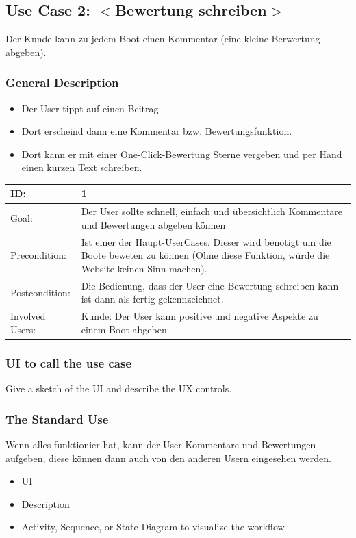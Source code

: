 \documentclass[12pt]{article}
\theoremstyle{definition}
\newenvironment{explanation}{%
   \setlength{\parindent}{0pt}
   \itshape
   \color{blue}
}{}
\begin{document}
\subsection{Use Case 2: $<$Bewertung schreiben$>$}
\begin{explanation}
Der Kunde kann zu jedem Boot einen Kommentar (eine kleine Berwertung abgeben).
\end{explanation}
\subsubsection{General Description}
\begin{explanation}
	\begin{itemize}
		\item Der User tippt auf einen Beitrag.
		\item Dort erscheind dann eine Kommentar bzw. Bewertungsfunktion.
		\item Dort kann er mit einer One-Click-Bewertung Sterne vergeben und per Hand einen kurzen Text schreiben.
	\end{itemize}
\end{explanation}

\begin{tabular}{|p{.2\linewidth}|p{.65\linewidth}|}
\hline 
ID: & 1 \\ \hline
Goal: & Der User sollte schnell, einfach und übersichtlich Kommentare und Bewertungen abgeben können \\ \hline
Precondition: & Ist einer der Haupt-UserCases. Dieser wird benötigt um die Boote beweten zu können (Ohne diese Funktion, würde die Website keinen Sinn machen). \\ \hline
Postcondition: & Die Bedienung, dass der User eine Bewertung schreiben kann ist dann als fertig gekennzeichnet. \\ \hline
Involved Users: &Kunde: Der User kann positive und negative Aspekte zu einem Boot abgeben. \\ \hline
\end{tabular}

\subsubsection{UI to call the use case}
\begin{explanation}
Give a sketch of the UI and describe the UX controls.
\end{explanation}

\subsubsection{The Standard Use}
\begin{explanation}
Wenn alles funktionier hat, kann der User Kommentare und Bewertungen aufgeben, diese können dann auch von den anderen Usern eingesehen werden.
\begin{itemize}
	\item UI
	\item Description
	\item Activity, Sequence, or State Diagram to visualize the workflow
\end{itemize}
\end{explanation}
\end{document}
